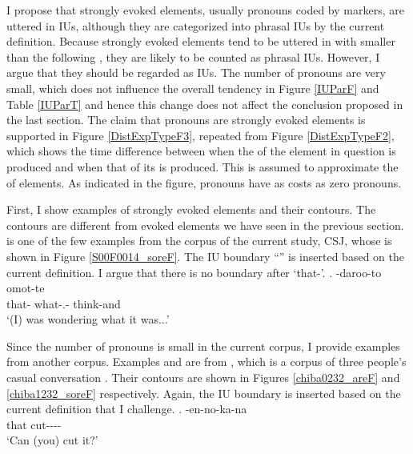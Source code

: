 I propose that strongly evoked elements, usually pronouns coded by  markers, are uttered in  IUs,
although they are categorized into phrasal IUs by the current definition.
Because strongly evoked elements tend to be uttered in  with smaller  than the following ,
they are likely to be counted as phrasal IUs.
However, I argue that they should be regarded as  IUs.
The number of pronouns are very small, which does not influence the overall tendency in Figure \ref{IUParF} and Table \ref{IUParT} and
hence this change does not affect the conclusion proposed in the last section.
The claim that pronouns are strongly evoked elements
is supported in
Figure \ref{DistExpTypeF3},
repeated from Figure \ref{DistExpTypeF2},
which shows the time difference between
when the  of the element in question is produced and
when that of its  is produced.
This is assumed to approximate the  of elements.
As indicated in the figure,
pronouns have as  costs as zero pronouns.

First, I show examples of strongly evoked elements and their  contours.
The  contours are different from evoked elements we have seen
in the previous section.
\Next is one of the few examples from the corpus of the current study, CSJ,
whose  is shown in Figure \ref{S00F0014_soreF}.
The IU boundary ``\iub'' is inserted based on the current definition.
I argue that there is no boundary after  `that-'.
%
\exg.\label{S00F0014_sore} \tp{\dvline} -daroo-to omot-te \tp{\dvline} \\
		that- {} what-.- think-and {} \\
		`(I) was wondering what it was...'

Since the number of pronouns is small in the current corpus,
I provide examples from another corpus.
Examples \Next and \NNext are from
,
which is a corpus of three people's casual conversation \cite{Den_2007_SAC}.
Their  contours are shown in Figures \ref{chiba0232_areF} and \ref{chiba1232_soreF} respectively.
Again, the IU boundary is inserted based on the current definition
that I challenge.
%
\exg.\label{chiba0232_are} \tp{\dvline} -en-no-ka-na \tp{\dvline} \\
		that {} cut---\ab{q}- {} \\
		`Can (you) cut it?'

